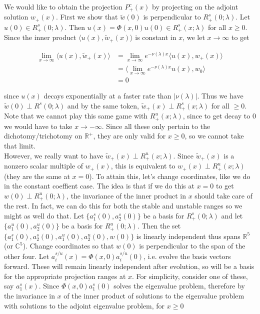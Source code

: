 \documentclass[12pt]{article}
\def\R{{\mathbb R}}
\def\C{{\mathbb C}}
\begin{document}
We would like to obtain the projection $P^c_+(x)$ by projecting on the adjoint solution $w_+(x)$. First we show that $\tilde{w}(0)$ is perpendicular to $R^s_+(0; \lambda)$. Let $u(0) \in R^s_+(0; \lambda)$. Then $u(x) = \Phi(x, 0)u(0) \in R^s_+(x; \lambda)$ for all $x \geq 0$. Since the inner product $\langle u(x), \tilde{w}_+(x) \rangle$ is constant in $x$, we let $x \rightarrow \infty$ to get

\begin{align*}
\lim_{x \rightarrow \infty} \langle u(x), \tilde{w}_+(x) \rangle &= \lim_{x \rightarrow \infty} e^{-\nu(\lambda) x} \langle u(x), w_+(x) \rangle \\
&= \langle \lim_{x \rightarrow \infty} e^{-\nu(\lambda) x} u(x), w_0 \rangle \\
&= 0
\end{align*}

since $u(x)$ decays exponentially at a faster rate than $|\nu(\lambda)|$. Thus we have $\tilde{w}(0) \perp R^s(0; \lambda)$ and by the same token, $\tilde{w}_+(x) \perp R^s_+(x; \lambda)$ for all $ \geq 0$.\\

Note that we cannot play this same game with $R^u_+(x; \lambda)$, since to get decay to 0 we would have to take $x \rightarrow -\infty$. Since all these only pertain to the dichotomy/trichotomy on $\R^+$, they are only valid for $x \geq 0$, so we cannot take that limit.\\

However, we really want to have $\tilde{w}_+(x) \perp R^u_+(x; \lambda)$. Since $\tilde{w}_+(x)$ is a nonzero scalar multiple of $w_+(x)$, this is equivalent to $w_+(x) \perp R^u_+(x; \lambda)$ (they are the same at $x = 0$). To attain this, let's change coordinates, like we do in the constant coeffient case. The idea is that if we do this at $x = 0$ to get $w(0) \perp R^u_+(0; \lambda)$, the invariance of the inner product in $x$ should take care of the rest. In fact, we can do this for both the stable and unstable ranges so we might as well do that. Let $\{ a^s_1(0), a^s_2(0)\}$ be a basis for $R^s_+(0; \lambda)$ and let $\{a^u_1(0), a^u_2(0)\}$ be a basis for $R^u_+(0; \lambda)$. Then the set $\{ a^s_1(0), a^s_2(0),a^u_1(0), a^u_2(0), w(0) \}$ is linearly independent thus spans $\R^5$ (or $\C^5$). Change coordinates so that $w(0)$ is perpendicular to the span of the other four. Let $a^{s/u}_i(x) = \Phi(x,0)a^{s/u}_i(0)$, i.e. evolve the basis vectors forward. These will remain linearly independent after evolution, so will be a basis for the appropriate projection ranges at $x$. For simplicity, consider one of these, say $a^s_1(x)$. Since $\Phi(x,0) a^s_1(0)$ solves the eigenvalue problem, therefore by the invariance in $x$ of the inner product of solutions to the eigenvalue problem with solutions to the adjoint eigenvalue problem, for $x \geq 0$
\end{document}
